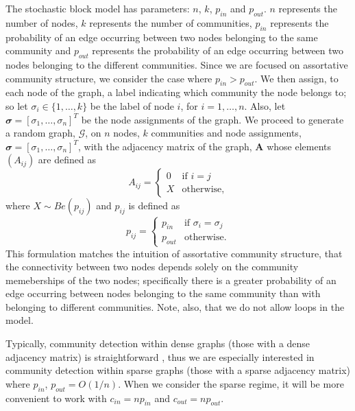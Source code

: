 \documentclass[12pt]{article}
\numberwithin{equation}{section}
\begin{document}
The stochastic block model has parameters: $n$, $k$, $p_{in}$ and $p_{out}$. $n$ represents the number of nodes, $k$ represents the number of communities, $p_{in}$ represents the probability of an edge occurring between two nodes belonging to the same community and $p_{out}$ represents the probability of an edge occurring between two nodes belonging to the different communities. Since we are focused on assortative community structure, we consider the case where $p_{in} > p_{out}$. We then assign, to each node of the graph, a label indicating which community the node belongs to; so let $\sigma_{i} \in \{1,\dots,k\}$ be the label of node $i$, for $i = 1,\dots,n$. Also, let $\mathbfit{\sigma} = [\sigma_{1},\dots,\sigma_{n}]^{T}$ be the node assignments of the graph. We proceed to generate a random graph, $\mathcal{G}$, on $n$ nodes, $k$ communities and node assignments, $\mathbfit{\sigma} = [\sigma_{1},\dots,\sigma_{n}]^{T}$, with the adjacency matrix of the graph, $\mathbf{A}$ whose elements $(A_{ij})$ are defined as
\begin{equation}
	A_{ij} =
	\begin{cases}
		0 & \text{if } i = j\\
		X & \text{otherwise},
	\end{cases}
\end{equation}
where $X \sim Be(p_{ij})$ and {$p_{ij}$} is defined as
\begin{equation}
	p_{ij} =
	\begin{cases}
		p_{in} & \text{if } \sigma_{i} = \sigma_{j}\\
		p_{out} & \text{otherwise}.
	\end{cases}
\end{equation}
This formulation matches the intuition of assortative community structure, that the connectivity between two nodes depends solely on the community memeberships of the two nodes; specifically there is a greater probability of an edge occurring between nodes belonging to the same community than with belonging to different communities. Note, also, that we do not allow loops in the model.

Typically, community detection within dense graphs (those with a dense adjacency matrix) is straightforward \cite{DKM+13}, thus we are especially interested in community detection within sparse graphs (those with a sparse adjacency matrix) where $p_{in}$, $p_{out} = O(1/n)$. When we consider the sparse regime, it will be more convenient to work with $c_{in} = np_{in}$ and $c_{out} = np_{out}$.
\end{document}
